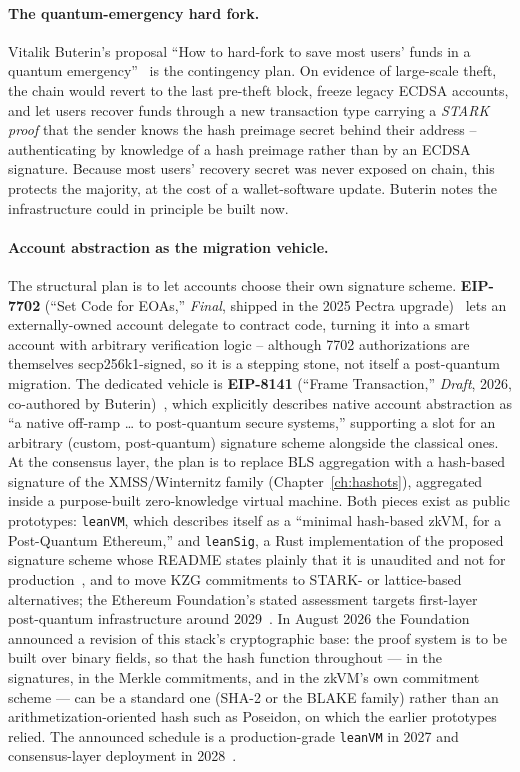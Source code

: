 \paragraph{The quantum-emergency hard fork.}
Vitalik Buterin's proposal ``How to hard-fork to save most users' funds in a quantum emergency''~\cite{buterinquantum2024} is the contingency plan. On evidence of large-scale theft, the chain would revert to the last pre-theft block, freeze legacy ECDSA accounts, and let users recover funds through a new transaction type carrying a \emph{STARK proof} that the sender knows the hash preimage secret behind their address -- authenticating by knowledge of a hash preimage rather than by an ECDSA signature. Because most users' recovery secret was never exposed on chain, this protects the majority, at the cost of a wallet-software update. Buterin notes the infrastructure could in principle be built now.

\paragraph{Account abstraction as the migration vehicle.}
The structural plan is to let accounts choose their own signature scheme. \textbf{EIP-7702} (``Set Code for EOAs,'' \emph{Final}, shipped in the 2025 Pectra upgrade)~\cite{eip7702} lets an externally-owned account delegate to contract code, turning it into a smart account with arbitrary verification logic -- although 7702 authorizations are themselves secp256k1-signed, so it is a stepping stone, not itself a post-quantum migration. The dedicated vehicle is \textbf{EIP-8141} (``Frame Transaction,'' \emph{Draft}, 2026, co-authored by Buterin)~\cite{eip8141}, which explicitly describes native account abstraction as ``a native off-ramp \dots{} to post-quantum secure systems,'' supporting a slot for an arbitrary (custom, post-quantum) signature scheme alongside the classical ones. At the consensus layer, the plan is to replace BLS aggregation with a hash-based signature of the XMSS/Winternitz family (Chapter~\ref{ch:hashots}), aggregated inside a purpose-built zero-knowledge virtual machine. Both pieces exist as public prototypes: \texttt{leanVM}, which describes itself as a ``minimal hash-based zkVM, for a Post-Quantum Ethereum,'' and \texttt{leanSig}, a Rust implementation of the proposed signature scheme whose README states plainly that it is unaudited and not for production~\cite{leanvm}, and to move KZG commitments to STARK- or lattice-based alternatives; the Ethereum Foundation's stated assessment targets first-layer post-quantum infrastructure around 2029~\cite{ethpqroadmap}. In August 2026 the Foundation announced a revision of this stack's cryptographic base: the proof system is to be built over binary fields, so that the hash function throughout --- in the signatures, in the Merkle commitments, and in the zkVM's own commitment scheme --- can be a standard one (SHA-2 or the BLAKE family) rather than an arithmetization-oriented hash such as Poseidon, on which the earlier prototypes relied. The announced schedule is a production-grade \texttt{leanVM} in 2027 and consensus-layer deployment in 2028~\cite{efbinary2026}.

